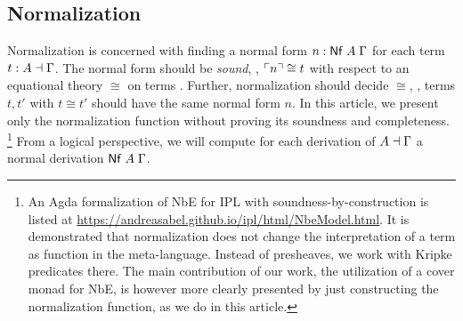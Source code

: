 \documentclass[sigconf,screen,fleqn]{acmart} %
\begin{document}
\subsection{Normalization}
\label{sec:normstlc}

Normalization is concerned with finding a normal form
$n : \mathsf{Nf}\;A\;\Gamma$ for each term $t : A \dashv \Gamma$.
The normal form should be \emph{sound},
\ie, $\ulcorner n\urcorner \cong t$
with respect to an equational theory $\cong$ on terms%
. %
Further, normalization should decide $\cong$, \ie,
terms $t,t'$ with $t \cong t'$ should have the same normal form $n$.
In this article, we present only the normalization function
without proving its soundness and completeness.%
\footnote{An Agda formalization of NbE for IPL with
soundness-by-construction is listed at
  \url{https://andreasabel.github.io/ipl/html/NbeModel.html}.
It is demonstrated that normalization does not change the
interpretation of a term as function in the meta-language.
Instead of presheaves, we work with Kripke predicates there.
The main contribution of our work, the utilization of a cover monad
for NbE, is however more clearly presented by just constructing the
normalization function, as we do in this article.
}
From a logical perspective, we will compute for each derivation of $A
\dashv \Gamma$ a normal derivation $\mathsf{Nf}\;A\;\Gamma$.


\end{document}
